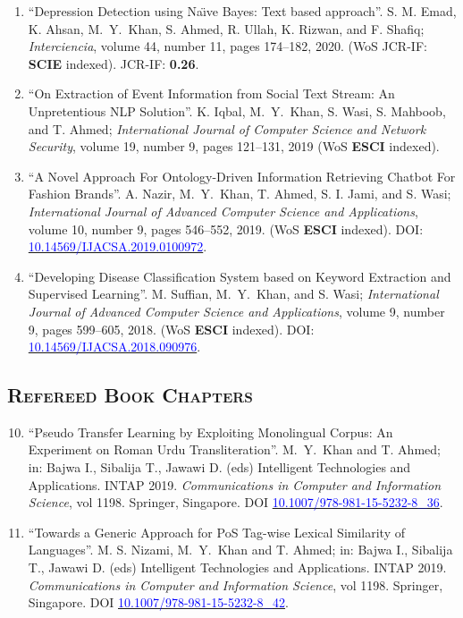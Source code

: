 \documentclass[a4paper, 10pt]{article}
\begin{document}
\begin{enumerate}
    \item ``Depression Detection using Na\"{\i}ve Bayes: Text based approach''. S. M. Emad, K. Ahsan, \textcolor{NavyBlue}{M.~Y.~Khan}, S. Ahmed, R. Ullah, K. Rizwan, and F. Shafiq; \emph{Interciencia}, volume 44, number 11, pages 174--182, 2020. (WoS JCR-IF: {\bfseries SCIE} indexed). JCR-IF: {\bfseries 0.26}.
	
	\item ``On Extraction of Event Information from Social Text Stream: An Unpretentious NLP Solution''. K. Iqbal, \textcolor{NavyBlue}{M.~Y.~Khan}, S. Wasi, S. Mahboob, and T. Ahmed; \emph{International Journal of Computer Science and Network Security}, volume 19, number 9, pages 121--131, 2019 (WoS {\bfseries ESCI} indexed).
 
	\item ``A Novel Approach For Ontology-Driven Information Retrieving Chatbot For Fashion Brands''. A. Nazir, \textcolor{NavyBlue}{M.~Y.~Khan}, T. Ahmed, S. I. Jami, and S. Wasi; \emph{International Journal of Advanced Computer Science and Applications}, volume 10, number 9, pages 546--552, 2019. (WoS {\bfseries ESCI} indexed). DOI: \href{https://doi.org/10.14569/IJACSA.2019.0100972}{\textcolor{blue}{10.14569/IJACSA.2019.0100972}}.
      
	\item ``Developing Disease Classification System based on Keyword Extraction and Supervised Learning''. M. Suffian, \textcolor{NavyBlue}{M.~Y.~Khan}, and S. Wasi; \emph{International Journal of Advanced Computer Science and Applications}, volume 9, number 9, pages 599--605, 2018. (WoS {\bfseries ESCI} indexed). DOI: \href{https://doi.org/10.14569/IJACSA.2018.090976}{\textcolor{blue}{10.14569/IJACSA.2018.090976}}.
\end{enumerate}


\subsection*{\normalfont\textsc{Refereed Book Chapters}}
\begin{enumerate}
\setcounter{enumi}{9}
\itemsep-4pt 
 \item ``Pseudo Transfer Learning by Exploiting Monolingual Corpus: An Experiment on Roman Urdu Transliteration''. \textcolor{NavyBlue}{M.~Y.~Khan} and T. Ahmed; in: Bajwa I., Sibalija T., Jawawi D. (eds) Intelligent Technologies and Applications. INTAP 2019. \emph{Communications in Computer and Information Science}, vol 1198. Springer, Singapore. DOI \href{https://doi.org/10.1007/978-981-15-5232-8_36}{\textcolor{blue}{10.1007/978-981-15-5232-8\_36}}.
  
   \item ``Towards a Generic Approach for PoS Tag-wise Lexical Similarity of Languages''. M. S. Nizami, \textcolor{NavyBlue}{M.~Y.~Khan} and T. Ahmed; in: Bajwa I., Sibalija T., Jawawi D. (eds) Intelligent Technologies and Applications. INTAP 2019. \emph{Communications in Computer and Information Science}, vol 1198. Springer, Singapore. DOI \href{https://doi.org/10.1007/978-981-15-5232-8_42}{\textcolor{blue}{10.1007/978-981-15-5232-8\_42}}.
   
 \end{enumerate}
\end{document}
